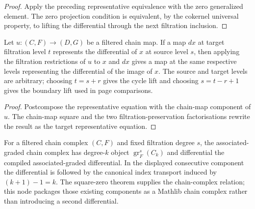 \begin{proof}
  \leanok
  Apply the preceding representative equivalence with the zero generalized
  element.  The zero projection condition is equivalent, by the cokernel
  universal property, to lifting the differential through the next filtration
  inclusion.
\end{proof}

\begin{theorem}
  \label{thm:filtered-differential-representative-naturality}
  \leanok
  Let $u:(C,F)\to(D,G)$ be a filtered chain map.  If a map $dx$ at target
  filtration level $t$ represents the differential of $x$ at source level
  $s$, then applying the filtration restrictions of $u$ to $x$ and $dx$
  gives a map at the same respective levels representing the differential of
  the image of $x$.  The source and target levels are arbitrary; choosing
  $t=s+r$ gives the cycle lift and choosing $s=t-r+1$ gives the boundary lift
  used in page comparisons.
\end{theorem}

\begin{proof}
  \leanok
  Postcompose the representative equation with the chain-map component of
  $u$.  The chain-map square and the two filtration-preservation
  factorisations rewrite the result as the target representative equation.
\end{proof}

\begin{definition}
  \label{def:filtered-associated-graded-complex}
  \leanok
  For a filtered chain complex $(C,F)$ and fixed filtration degree $s$, the
  associated-graded chain complex has degree-$k$ object
  $\operatorname{gr}^s_F(C_k)$ and differential the compiled
  associated-graded differential.  In the displayed consecutive component the
  differential is followed by the canonical index transport induced by
  $(k+1)-1=k$.  The square-zero theorem supplies the chain-complex
  relation; this node packages those existing components as a Mathlib chain
  complex rather than introducing a second differential.
\end{definition}


